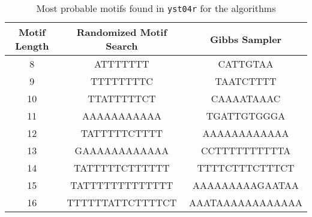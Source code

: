 \begin{table}[!h]
	\centering
	\begin{tabular}{|c|c|c|}
		\hline
		\textbf{Motif Length} & \textbf{Randomized Motif Search} & \textbf{Gibbs Sampler} \\
		\hline
		8                     & ATTTTTTT                         & CATTGTAA               \\
		9                     & TTTTTTTTC                        & TAATCTTTT              \\
		10                    & TTATTTTTCT                       & CAAAATAAAC             \\
		11                    & AAAAAAAAAAA                      & TGATTGTGGGA            \\
		12                    & TATTTTTCTTTT                     & AAAAAAAAAAAA           \\
		13                    & GAAAAAAAAAAAA                    & CCTTTTTTTTTTA          \\
		14                    & TATTTTTCTTTTTT                   & TTTTCTTTCTTTCT         \\
		15                    & TATTTTTTTTTTTTT                  & AAAAAAAAAGAATAA        \\
		16                    & TTTTTTATTCTTTTCT                 & AAATAAAAAAAAAAAA       \\
		\hline
	\end{tabular}
	\caption{Most probable motifs found in \texttt{yst04r} for the algorithms}

\end{table}

